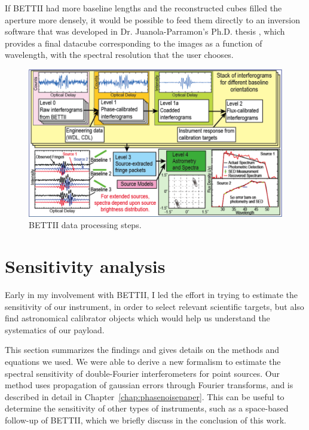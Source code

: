 If BETTII had more baseline lengths and the reconstructed cubes filled the aperture more densely, it would be possible to feed them directly to an inversion software that was developed in Dr. Juanola-Parramon's Ph.D. thesis \citep{Juanola:2016}, which provides a final datacube corresponding to the images as a function of wavelength, with the spectral resolution that the user chooses. 

\begin{figure}[!h]
	\centering
	\includegraphics[width=\textwidth]{Figures/DataProcessing.png}
	\caption[Data processing]{BETTII data processing steps.}
	\label{fig:dataProcessing}
    \end{figure}



\newpage
\section{Sensitivity analysis}

Early in my involvement with BETTII, I led the effort in trying to estimate the sensitivity of our instrument, in order to select relevant scientific targets, but also find astronomical calibrator objects which would help us understand the systematics of our payload.

This section summarizes the findings and gives details on the methods and equations we used. We were able to derive a new formalism to estimate the spectral sensitivity of double-Fourier interferometers for point sources. Our method uses propagation of gaussian errors through Fourier transforms, and is described in detail in Chapter~\ref{chap:phasenoisepaper}. This can be useful to determine the sensitivity of other types of instruments, such as a space-based follow-up of BETTII, which we briefly discuss in the conclusion of this work.

